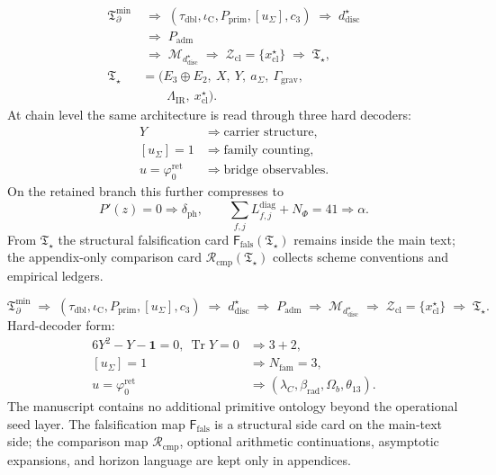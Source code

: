 \documentclass[11pt,a4paper]{article}
\theoremstyle{definition}
\theoremstyle{remark}
\DeclareMathOperator{\tr}{Tr}
\newcommand{\taudbl}{\tau_{\mathrm{dbl}}}
\newcommand{\iC}{\iota_{\mathrm C}}
\newcommand{\cthree}{c_3}
\newcommand{\phiz}{\varphi_0^{\mathrm{ret}}}
\newcommand{\Tbound}{\mathfrak T_{\partial}^{\min}}
\newcommand{\Padm}{P_{\mathrm{adm}}}
\newcommand{\Pprim}{P_{\mathrm{prim}}}
\newcommand{\Tstar}{\mathfrak T_{\star}}
\newcommand{\Ffals}{\mathsf F_{\mathrm{fals}}}
\newcommand{\Rcmp}{\mathcal R_{\mathrm{cmp}}}
\begin{document}
\begin{tcolorbox}[colback=tfptblue!3, colframe=tfptblue, breakable,
    title={Closed TFPT Chain}, colbacktitle=tfptblue]
\begin{equation}
\label{eq:compiler-chain}
\begin{aligned}
\Tbound
&\;\Rightarrow\;
(\taudbl,\iC,\Pprim,[u_\Sigma],\cthree)
\;\Rightarrow\;
d^\star_{\mathrm{disc}}\\
&\;\Rightarrow\;
\Padm
\\
&\;\Rightarrow\;
\mathcal M_{d^\star_{\mathrm{disc}}}
\;\Rightarrow\;
\mathcal Z_{\mathrm{cl}}=\{x^\star_{\mathrm{cl}}\}
\;\Rightarrow\;
\Tstar,\\
\Tstar
&=
\bigl(
E_3\oplus E_2,\ X,\ Y,\ a_\Sigma,\ \Gamma_{\mathrm{grav}},\\
&\qquad
\Lambda_{\mathrm{IR}},\ x_{\mathrm{cl}}^\star
\bigr).
\end{aligned}
\end{equation}
At chain level the same architecture is read through three hard decoders:
\[
\begin{aligned}
Y&\Rightarrow \text{carrier structure},\\
[u_\Sigma]=1&\Rightarrow \text{family counting},\\
u=\phiz&\Rightarrow \text{bridge observables}.
\end{aligned}
\]
On the retained branch this further compresses to
\[
P'(z)=0\Rightarrow \delta_{\mathrm{ph}},
\qquad
\sum_{f,j}L_{f,j}^{\mathrm{diag}}+N_\Phi=41\Rightarrow \alpha.
\]
From $\Tstar$ the structural falsification card $\Ffals(\Tstar)$ remains inside the main text;
the appendix-only comparison card $\Rcmp(\Tstar)$ collects scheme conventions and empirical
ledgers.
\end{tcolorbox}

\begin{tcolorbox}[colback=tfptorange!4, colframe=tfptorange!80!black, breakable,
    title={Closed Theorem Stack in the Present Version}, colbacktitle=tfptorange!85!black]
\[
\Tbound
\;\Rightarrow\;
(\taudbl,\iC,\Pprim,[u_\Sigma],\cthree)
\;\Rightarrow\;
d^\star_{\mathrm{disc}}
\;\Rightarrow\;
\Padm
\;\Rightarrow\;
\mathcal M_{d^\star_{\mathrm{disc}}}
\;\Rightarrow\;
\mathcal Z_{\mathrm{cl}}=\{x^\star_{\mathrm{cl}}\}
\;\Rightarrow\;
\Tstar.
\]
Hard-decoder form:
\[
\begin{aligned}
6Y^2-Y-\mathbf 1=0,\ \tr Y=0
&\Rightarrow
3+2,\\
[u_\Sigma]=1
&\Rightarrow
N_{\mathrm{fam}}=3,\\
u=\phiz
&\Rightarrow
(\lambda_C,\beta_{\mathrm{rad}},\Omega_b,\theta_{13}).
\end{aligned}
\]
The manuscript contains no additional primitive ontology beyond the operational seed layer. The
falsification map $\Ffals$ is a structural side card on the main-text side; the comparison map
$\Rcmp$, optional arithmetic continuations, asymptotic expansions, and horizon language are
kept only in appendices.
\end{tcolorbox}
\end{document}
